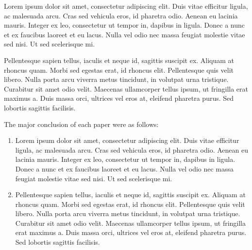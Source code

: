 \renewcommand{\theenumi}{\Roman{enumi}}
Lorem ipsum dolor sit amet, consectetur adipiscing elit. Duis vitae efficitur ligula, ac malesuada arcu. Cras sed vehicula eros, id pharetra odio. Aenean eu lacinia mauris. Integer ex leo, consectetur ut tempor in, dapibus in ligula. Donec a nunc et ex faucibus laoreet et eu lacus. Nulla vel odio nec massa feugiat molestie vitae sed nisi. Ut sed scelerisque mi.

Pellentesque sapien tellus, iaculis et neque id, sagittis suscipit ex. Aliquam at rhoncus quam. Morbi sed egestas erat, id rhoncus elit. Pellentesque quis velit libero. Nulla porta arcu viverra metus tincidunt, in volutpat urna tristique. Curabitur sit amet odio velit. Maecenas ullamcorper tellus ipsum, ut fringilla erat maximus a. Duis massa orci, ultrices vel eros at, eleifend pharetra purus. Sed lobortis sagittis facilisis.

The major conclusion of each paper were as follows:
\begin{enumerate}
	\item Lorem ipsum dolor sit amet, consectetur adipiscing elit. Duis vitae efficitur ligula, ac malesuada arcu. Cras sed vehicula eros, id pharetra odio. Aenean eu lacinia mauris. Integer ex leo, consectetur ut tempor in, dapibus in ligula. Donec a nunc et ex faucibus laoreet et eu lacus. Nulla vel odio nec massa feugiat molestie vitae sed nisi. Ut sed scelerisque mi.

	\item Pellentesque sapien tellus, iaculis et neque id, sagittis suscipit ex. Aliquam at rhoncus quam. Morbi sed egestas erat, id rhoncus elit. Pellentesque quis velit libero. Nulla porta arcu viverra metus tincidunt, in volutpat urna tristique. Curabitur sit amet odio velit. Maecenas ullamcorper tellus ipsum, ut fringilla erat maximus a. Duis massa orci, ultrices vel eros at, eleifend pharetra purus. Sed lobortis sagittis facilisis.
\end{enumerate}

\renewcommand{\theenumi}{\arabic{enumi}}